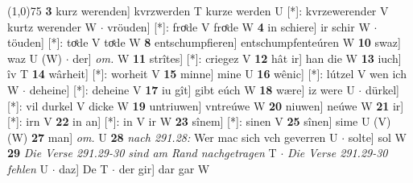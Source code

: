\documentclass[8pt,a4paper,notitlepage]{article}
\begin{document}
\begin{table}[ht]
\begin{minipage}[t]{0.5\linewidth}
\line(1,0){75} \newline
\textbf{3} kurz werenden] kvrzwerden T kurze werden U [*]: kvrzewerender V kurtz werender W  $\cdot$ vröuden] [*]: froͤde V froͤde W \textbf{4} in schiere] ir schir W  $\cdot$ töuden] [*]: toͤde V toͤde W \textbf{8} entschumpfieren] entschumpfenteúren W \textbf{10} swaz] waz U (W)  $\cdot$ der] \textit{om.} W \textbf{11} strîtes] [*]: criegez V \textbf{12} hât ir] han die W \textbf{13} iuch] îv T \textbf{14} wârheit] [*]: worheit V \textbf{15} minne] mine U \textbf{16} wênic] [*]: lútzel V wen ich W  $\cdot$ deheine] [*]: deheine V \textbf{17} iu gît] gibt eúch W \textbf{18} wære] iz were U  $\cdot$ dürkel] [*]: vil durkel V dicke W \textbf{19} untriuwen] vntreúwe W \textbf{20} niuwen] neúwe W \textbf{21} ir] [*]: irn V \textbf{22} in an] [*]: in V ir W \textbf{23} sînem] [*]: sinen V \textbf{25} sînen] sime U (V) (W) \textbf{27} man] \textit{om.} U \textbf{28} \textit{nach 291.28:} Wer mac sich vch geverren U   $\cdot$ solte] sol W \textbf{29} \textit{Die Verse 291.29-30 sind am Rand nachgetragen} T   $\cdot$ \textit{Die Verse 291.29-30 fehlen} U   $\cdot$ daz] De T  $\cdot$ der gir] dar gar W \newline
\end{minipage}
\end{table}
\end{document}
